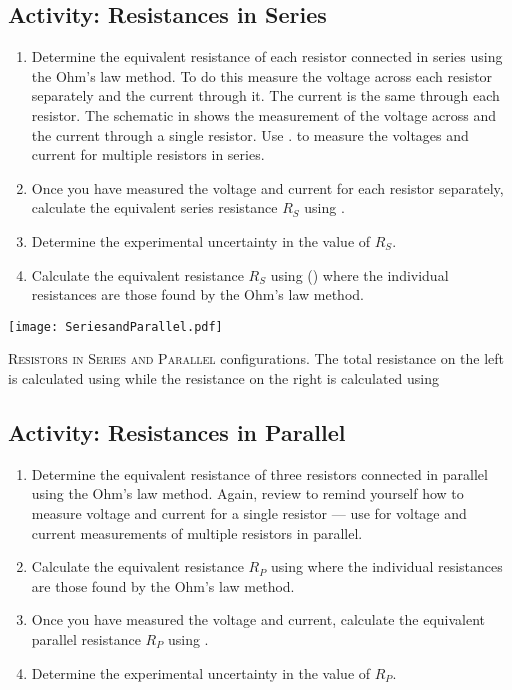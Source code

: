 \subsection{Activity: Resistances in Series} \label{s:series}
\begin{enumerate}
	\item \label{l:eqs} Determine the equivalent resistance of each resistor connected in series using the Ohm's law method. To do this measure the voltage across each resistor separately and the current through it. The current is the same through each resistor. The schematic in  shows the measurement of the voltage across and the current through a single resistor. Use . to measure the voltages and current for multiple resistors in series.
	

	\item Once you have measured the voltage and current for each resistor separately, calculate the equivalent series resistance $R_S$ using .
	
	\item Determine the experimental uncertainty in the value of $R_S$. %
	
	\item Calculate the equivalent resistance $R_S$ using () where the individual resistances are those found by the Ohm's law method. %
\end{enumerate}

\begin{marginfigure}
	\centering
	\texttt{[image: SeriesandParallel.pdf]}
	\caption[Series and Parallel Resistors]{\textsc{Resistors in Series and Parallel} configurations.  The total resistance on the left is calculated using  while the resistance on the right is calculated using }
	\label{f:resistor-series-par}
\end{marginfigure}


\subsection{Activity: Resistances in Parallel}
\begin{enumerate}
	\item Determine the equivalent resistance of three resistors connected in parallel using the Ohm's law method.  Again, review  to remind yourself how to measure voltage and current for a single resistor --- use  for voltage and current measurements of multiple resistors in parallel.
	
	\item Calculate the equivalent resistance $R_P$ using  where the individual resistances are those found by the Ohm's law method.

	\item Once you have measured the voltage and current, calculate the equivalent parallel resistance $R_P$ using .
	
	\item Determine the experimental uncertainty in the value of $R_P$.
\end{enumerate}

